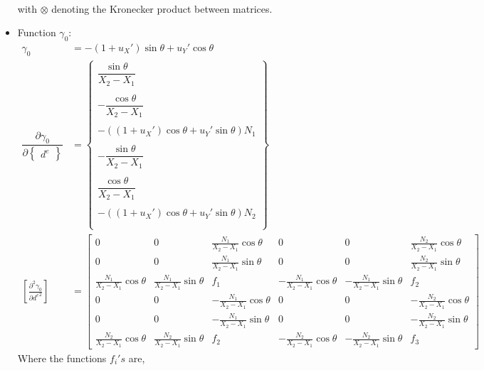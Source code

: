 \documentclass[10pt]{article}
\begin{document}
\begin{itemize}
\begin{align}
    \label{eq:e0}
  \end{align}
  with $\otimes$ denoting the Kronecker product between matrices.
\item Function $\gamma_0$:
  \begin{align}
    \gamma_0 &= -(1+u_X')\sin\theta + u_Y'\cos\theta\nonumber\\
    \dfrac{\partial \gamma_0}{\partial \begin{Bmatrix} d^e \end{Bmatrix}} &= \begin{Bmatrix}
      \dfrac{\sin\theta}{X_2-X_1}\\\\ -\dfrac{\cos\theta}{X_2-X_1}\\\\
      -((1+u_X')\cos\theta + u_Y'\sin\theta)N_1\\\\
      -\dfrac{\sin\theta}{X_2-X_1}\\\\ \dfrac{\cos\theta}{X_2-X_1}\\\\
      -((1+u_X')\cos\theta +
      u_Y'\sin\theta)N_2\\\\\end{Bmatrix}\nonumber\\
\left[\frac{\partial^2 \gamma_0}{\partial {d^e}^2}\right] &= \begin{bmatrix}
      0 & 0 & \frac{N_1}{X_2-X_1}\cos\theta & 0 & 0 &
      \frac{N_2}{X_2-X_1}\cos\theta\\
      0 & 0 & \frac{N_1}{X_2-X_1}\sin\theta & 0 & 0 &
      \frac{N_2}{X_2-X_1}\sin\theta\\
      \frac{N_1}{X_2-X_1}\cos\theta & \frac{N_1}{X_2-X_1}\sin\theta &
      f_1 & -\frac{N_1}{X_2-X_1}\cos\theta &
      -\frac{N_1}{X_2-X_1}\sin\theta & f_2\\
      0 & 0 & -\frac{N_1}{X_2-X_1}\cos\theta & 0 & 0 &
      -\frac{N_2}{X_2-X_1}\cos\theta\\
      0 & 0 & -\frac{N_1}{X_2-X_1}\sin\theta & 0 & 0 &
      -\frac{N_2}{X_2-X_1}\sin\theta\\
      \frac{N_2}{X_2-X_1}\cos\theta & \frac{N_2}{X_2-X_1}\sin\theta &
      f_2 & -\frac{N_2}{X_2-X_1}\cos\theta &
      -\frac{N_2}{X_2-X_1}\sin\theta & f_3
    \end{bmatrix}    
    \label{eq:g0}
  \end{align}
  Where the functions $f_i's$ are,
  \begin{align}

\end{align}
\end{itemize}
\end{document}
